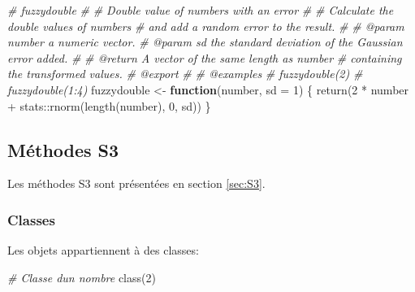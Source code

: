 \documentclass[
  11pt,
  french,
  a4paper,
  extrafontsizes,onecolumn,openright
  ]{memoir}
\newenvironment{Shaded}{\begin{snugshade}}{\end{snugshade}}
\newcommand{\AttributeTok}[1]{\textcolor[rgb]{0.77,0.63,0.00}{#1}}
\newcommand{\CommentTok}[1]{\textcolor[rgb]{0.56,0.35,0.01}{\textit{#1}}}
\newcommand{\ControlFlowTok}[1]{\textcolor[rgb]{0.13,0.29,0.53}{\textbf{#1}}}
\newcommand{\DecValTok}[1]{\textcolor[rgb]{0.00,0.00,0.81}{#1}}
\newcommand{\FunctionTok}[1]{\textcolor[rgb]{0.00,0.00,0.00}{#1}}
\newcommand{\NormalTok}[1]{#1}
\newcommand{\OtherTok}[1]{\textcolor[rgb]{0.56,0.35,0.01}{#1}}
\newcommand{\SpecialCharTok}[1]{\textcolor[rgb]{0.00,0.00,0.00}{#1}}
\begin{document}
\begin{Shaded}
\begin{Highlighting}[]
\CommentTok{\#\textquotesingle{} fuzzydouble}
\CommentTok{\#\textquotesingle{} }
\CommentTok{\#\textquotesingle{} Double value of numbers with an error}
\CommentTok{\#\textquotesingle{} }
\CommentTok{\#\textquotesingle{} Calculate the double values of numbers }
\CommentTok{\#\textquotesingle{} and add a random error to the result.}
\CommentTok{\#\textquotesingle{}}
\CommentTok{\#\textquotesingle{} @param number a numeric vector.}
\CommentTok{\#\textquotesingle{} @param sd the standard deviation of the Gaussian error added.}
\CommentTok{\#\textquotesingle{}}
\CommentTok{\#\textquotesingle{} @return A vector of the same length as \textasciigrave{}number\textasciigrave{}}
\CommentTok{\#\textquotesingle{}  containing the transformed values.}
\CommentTok{\#\textquotesingle{} @export}
\CommentTok{\#\textquotesingle{}}
\CommentTok{\#\textquotesingle{} @examples}
\CommentTok{\#\textquotesingle{} fuzzydouble(2)}
\CommentTok{\#\textquotesingle{} fuzzydouble(1:4)}
\NormalTok{fuzzydouble }\OtherTok{\textless{}{-}} \ControlFlowTok{function}\NormalTok{(number, }\AttributeTok{sd =} \DecValTok{1}\NormalTok{) \{}
    \FunctionTok{return}\NormalTok{(}\DecValTok{2} \SpecialCharTok{*}\NormalTok{ number }\SpecialCharTok{+}\NormalTok{ stats}\SpecialCharTok{::}\FunctionTok{rnorm}\NormalTok{(}\FunctionTok{length}\NormalTok{(number), }\DecValTok{0}\NormalTok{, }
\NormalTok{        sd))}
\NormalTok{\}}
\end{Highlighting}
\end{Shaded}

\normalsize

\hypertarget{muxe9thodes-s3}{%
\subsection{Méthodes S3}\label{muxe9thodes-s3}}

Les méthodes S3 sont présentées en section \ref{sec:S3}.

\hypertarget{classes}{%
\subsubsection{Classes}\label{classes}}

Les objets appartiennent à des classes:

\scriptsize

\begin{Shaded}
\begin{Highlighting}[]
\CommentTok{\# Classe d\textquotesingle{}un nombre}
\FunctionTok{class}\NormalTok{(}\DecValTok{2}\NormalTok{)}
\end{Highlighting}
\end{Shaded}
\end{document}
